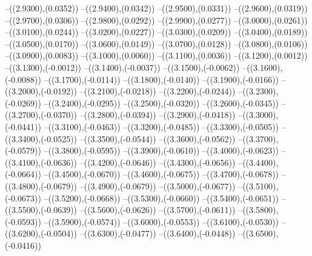 {	--({\sx*(2.9300)},{\sy*(0.0352)})
	--({\sx*(2.9400)},{\sy*(0.0342)})
	--({\sx*(2.9500)},{\sy*(0.0331)})
	--({\sx*(2.9600)},{\sy*(0.0319)})
	--({\sx*(2.9700)},{\sy*(0.0306)})
	--({\sx*(2.9800)},{\sy*(0.0292)})
	--({\sx*(2.9900)},{\sy*(0.0277)})
	--({\sx*(3.0000)},{\sy*(0.0261)})
	--({\sx*(3.0100)},{\sy*(0.0244)})
	--({\sx*(3.0200)},{\sy*(0.0227)})
	--({\sx*(3.0300)},{\sy*(0.0209)})
	--({\sx*(3.0400)},{\sy*(0.0189)})
	--({\sx*(3.0500)},{\sy*(0.0170)})
	--({\sx*(3.0600)},{\sy*(0.0149)})
	--({\sx*(3.0700)},{\sy*(0.0128)})
	--({\sx*(3.0800)},{\sy*(0.0106)})
	--({\sx*(3.0900)},{\sy*(0.0083)})
	--({\sx*(3.1000)},{\sy*(0.0060)})
	--({\sx*(3.1100)},{\sy*(0.0036)})
	--({\sx*(3.1200)},{\sy*(0.0012)})
	--({\sx*(3.1300)},{\sy*(-0.0012)})
	--({\sx*(3.1400)},{\sy*(-0.0037)})
	--({\sx*(3.1500)},{\sy*(-0.0062)})
	--({\sx*(3.1600)},{\sy*(-0.0088)})
	--({\sx*(3.1700)},{\sy*(-0.0114)})
	--({\sx*(3.1800)},{\sy*(-0.0140)})
	--({\sx*(3.1900)},{\sy*(-0.0166)})
	--({\sx*(3.2000)},{\sy*(-0.0192)})
	--({\sx*(3.2100)},{\sy*(-0.0218)})
	--({\sx*(3.2200)},{\sy*(-0.0244)})
	--({\sx*(3.2300)},{\sy*(-0.0269)})
	--({\sx*(3.2400)},{\sy*(-0.0295)})
	--({\sx*(3.2500)},{\sy*(-0.0320)})
	--({\sx*(3.2600)},{\sy*(-0.0345)})
	--({\sx*(3.2700)},{\sy*(-0.0370)})
	--({\sx*(3.2800)},{\sy*(-0.0394)})
	--({\sx*(3.2900)},{\sy*(-0.0418)})
	--({\sx*(3.3000)},{\sy*(-0.0441)})
	--({\sx*(3.3100)},{\sy*(-0.0463)})
	--({\sx*(3.3200)},{\sy*(-0.0485)})
	--({\sx*(3.3300)},{\sy*(-0.0505)})
	--({\sx*(3.3400)},{\sy*(-0.0525)})
	--({\sx*(3.3500)},{\sy*(-0.0544)})
	--({\sx*(3.3600)},{\sy*(-0.0562)})
	--({\sx*(3.3700)},{\sy*(-0.0579)})
	--({\sx*(3.3800)},{\sy*(-0.0595)})
	--({\sx*(3.3900)},{\sy*(-0.0610)})
	--({\sx*(3.4000)},{\sy*(-0.0623)})
	--({\sx*(3.4100)},{\sy*(-0.0636)})
	--({\sx*(3.4200)},{\sy*(-0.0646)})
	--({\sx*(3.4300)},{\sy*(-0.0656)})
	--({\sx*(3.4400)},{\sy*(-0.0664)})
	--({\sx*(3.4500)},{\sy*(-0.0670)})
	--({\sx*(3.4600)},{\sy*(-0.0675)})
	--({\sx*(3.4700)},{\sy*(-0.0678)})
	--({\sx*(3.4800)},{\sy*(-0.0679)})
	--({\sx*(3.4900)},{\sy*(-0.0679)})
	--({\sx*(3.5000)},{\sy*(-0.0677)})
	--({\sx*(3.5100)},{\sy*(-0.0673)})
	--({\sx*(3.5200)},{\sy*(-0.0668)})
	--({\sx*(3.5300)},{\sy*(-0.0660)})
	--({\sx*(3.5400)},{\sy*(-0.0651)})
	--({\sx*(3.5500)},{\sy*(-0.0639)})
	--({\sx*(3.5600)},{\sy*(-0.0626)})
	--({\sx*(3.5700)},{\sy*(-0.0611)})
	--({\sx*(3.5800)},{\sy*(-0.0593)})
	--({\sx*(3.5900)},{\sy*(-0.0574)})
	--({\sx*(3.6000)},{\sy*(-0.0553)})
	--({\sx*(3.6100)},{\sy*(-0.0530)})
	--({\sx*(3.6200)},{\sy*(-0.0504)})
	--({\sx*(3.6300)},{\sy*(-0.0477)})
	--({\sx*(3.6400)},{\sy*(-0.0448)})
	--({\sx*(3.6500)},{\sy*(-0.0416)})
}
